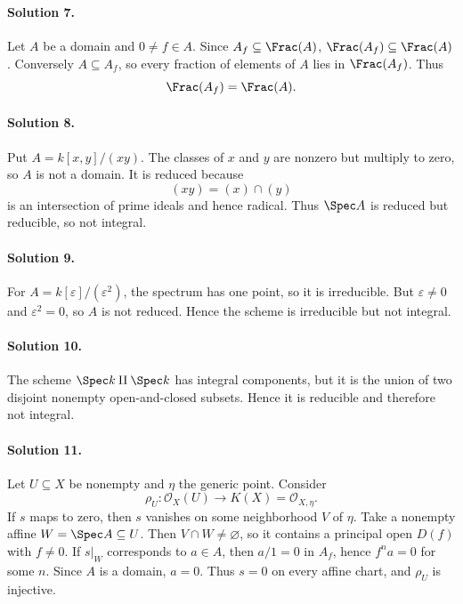 \paragraph{Solution 7.}
Let \(A\) be a domain and \(0\ne f\in A\). Since \(A_f\subseteq\Frac(A)\),
\(\Frac(A_f)\subseteq\Frac(A)\). Conversely \(A\subseteq A_f\), so every fraction of elements of
\(A\) lies in \(\Frac(A_f)\). Thus
\[
\Frac(A_f)=\Frac(A).
\]

\paragraph{Solution 8.}
Put \(A=k[x,y]/(xy)\). The classes of \(x\) and \(y\) are nonzero but multiply to zero, so \(A\)
is not a domain. It is reduced because
\[
(xy)=(x)\cap(y)
\]
is an intersection of prime ideals and hence radical. Thus \(\Spec A\) is reduced but reducible,
so not integral.

\paragraph{Solution 9.}
For \(A=k[\varepsilon]/(\varepsilon^2)\), the spectrum has one point, so it is irreducible.
But \(\varepsilon\ne0\) and \(\varepsilon^2=0\), so \(A\) is not reduced. Hence the scheme is
irreducible but not integral.

\paragraph{Solution 10.}
The scheme \(\Spec k\amalg\Spec k\) has integral components, but it is the union of two disjoint
nonempty open-and-closed subsets. Hence it is reducible and therefore not integral.

\paragraph{Solution 11.}
Let \(U\subseteq X\) be nonempty and \(\eta\) the generic point. Consider
\[
\rho_U:\mathcal O_X(U)\to K(X)=\mathcal O_{X,\eta}.
\]
If \(s\) maps to zero, then \(s\) vanishes on some neighborhood \(V\) of \(\eta\).
Take a nonempty affine \(W=\Spec A\subseteq U\). Then \(V\cap W\ne\varnothing\), so it contains
a principal open \(D(f)\) with \(f\ne0\). If \(s|_W\) corresponds to \(a\in A\), then
\(a/1=0\) in \(A_f\), hence \(f^na=0\) for some \(n\). Since \(A\) is a domain, \(a=0\).
Thus \(s=0\) on every affine chart, and \(\rho_U\) is injective.

